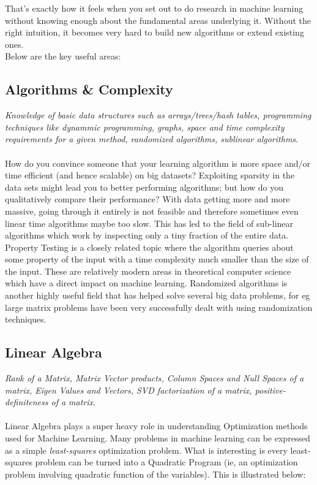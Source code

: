 \documentclass[a4paper]{article}
\begin{document}
\noindent That's exactly how it feels when you set out to do research in machine learning without knowing enough about the fundamental areas underlying it. Without the right intuition, it becomes very hard to build new algorithms or extend existing ones.\\

\noindent Below are the key useful areas:

\subsection{Algorithms \& Complexity}
\textit{Knowledge of basic data structures such as arrays/trees/hash tables, programming techniques like dynammic programming, graphs, space and time complexity requirements for a given method, randomized algorithms, sublinear algorithms}.\\ \\
How do you convince someone that your learning algorithm is more space and/or time efficient (and hence scalable) on big datasets? Exploiting sparsity in the data sets might lead you to better performing algorithms; but how do you qualitatively compare their performance? With data getting more and more massive, going through it entirely is not feasible and therefore sometimes even linear time algorithms maybe too slow. This has led to the field of sub-linear algorithms which work by inspecting only a tiny fraction of the entire data. Property Testing is a closely related topic where the algorithm queries about some property of the input with a time complexity much smaller than the size of the input. These are relatively modern areas in theoretical computer science which have a direct impact on machine learning. Randomized algorithms is another highly useful field that has helped solve several big data problems, for eg large matrix problems have been very successfully dealt with using randomization techniques.\\

\subsection{Linear Algebra}
\textit{Rank of a Matrix, Matrix Vector products, Column Spaces and Null Spaces of a matrix, Eigen Values and Vectors, SVD factorization of a matrix, positive-definiteness of a matrix}. \\ \\
Linear Algebra plays a super heavy role in understanding Optimization methods used for Machine Learning. Many problems in machine learning can be expressed as a simple {\it least-squares} optimization problem. What is interesting is every least-squares problem can be turned into a Quadratic Program (ie, an optimization problem involving quadratic function of the variables). This is illustrated below:
\end{document}

